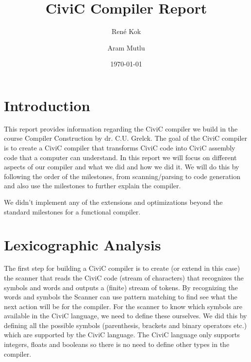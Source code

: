 \documentclass{uva-inf-article}
\title{CiviC Compiler Report}
\author{René Kok}
\author{Aram Mutlu}
\date{\today}
\begin{document}
\maketitle




\section{Introduction}
\par This report provides information regarding the CiviC compiler we build in 
the course Compiler Construction by dr. C.U. Grelck. The goal of the CiviC compiler 
is to create a CiviC compiler that transforms CiviC code into CiviC assembly code 
that a computer can understand. In this report we will focus on different aspects 
of our compiler and what we did and how we did it. We will do this by following the order of the milestones,
from scanning/parsing to code generation and also use the milestones to further 
explain the compiler.

We didn't implement any of the extensions and optimizations beyond the standard 
milestones for a functional compiler.

\newpage
\section{Lexicographic Analysis}
The first step for building a CiviC compiler is to create (or extend in this case) 
the scanner that reads the CiviC code (stream of characters) that recognizes the 
symbols and words and outputs a (finite) stream of tokens.
By recognizing the words and symbols the Scanner can use pattern matching to find see
what the next action will be for the compiler. For the scanner to know which symbols
are available in the CiviC language, we need to define these ourselves. We did this 
by defining all the possible symbols (parenthesis, brackets and binary operators etc.)
which are supported by the CiviC language. The CiviC language only supports integers,
floats and booleans so there is no need to define other types in the compiler.
\end{document}

